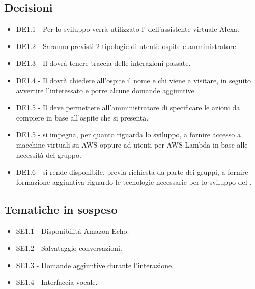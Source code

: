 \documentclass[a4paper,titlepage]{article}
\begin{document}
 \subsection{Decisioni}
 \begin{itemize}
  \item DE1.1 - Per lo sviluppo verrà utilizzato l' dell'assistente virtuale Alexa.
  \item DE1.2 - Saranno previsti 2 tipologie di utenti: ospite e amministratore.
  \item DE1.3 - Il  dovrà tenere traccia delle interazioni passate.
  \item DE1.4 - Il  dovrà chiedere all'ospite il nome e chi viene a visitare, in seguito avvertire l'interessato e porre alcune domande aggiuntive.
  \item DE1.5 - Il  deve permettere all'amministratore di specificare le azioni da compiere in base all'ospite che si presenta.
  \item DE1.5 - \PROPONENTE{} si impegna, per quanto riguarda lo sviluppo, a fornire accesso a macchine virtuali su AWS oppure ad utenti per AWS Lambda in base alle necessità del gruppo.
  \item DE1.6 - \PROPONENTE{} si rende disponibile, previa richiesta da parte dei gruppi, a fornire formazione aggiuntiva riguardo le tecnologie necessarie per lo sviluppo del .
 \end{itemize}

\subsection{Tematiche in sospeso}
  \begin{itemize}
  \item SE1.1 - Disponibilità Amazon Echo.
  \item SE1.2 - Salvataggio conversazioni.
  \item SE1.3 - Domande aggiuntive durante l'interazione.
  \item SE1.4 - Interfaccia vocale.
  \end{itemize}
\end{document}
